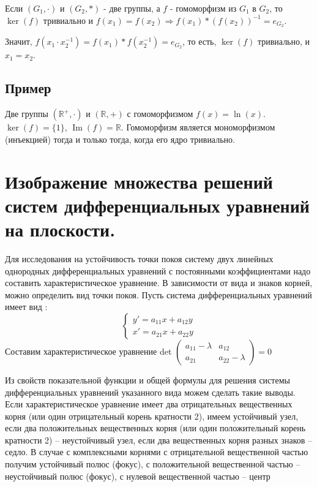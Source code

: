 \documentclass[12pt]{article}
\begin{document}
Если $(G_1,\cdot)$ и $(G_2,*)$ - две группы, а $f$ - гомоморфизм из $G_1$ в $G_2$, то $\operatorname{ker}(f)$ тривиально и $f(x_1)=f(x_2)\Rightarrow f(x_1)*(f(x_2))^{-1}=e_{G_2}$.

Значит, $f(x_1\cdot x_2^{-1})=f(x_1)*f(x_2^{-1})=e_{G_2}$, то есть, $\operatorname{ker}(f)$ тривиально, и $x_1=x_2$.

\subsection{Пример}

Две группы $(\mathbb{R}^{+},\cdot)$ и $(\mathbb{R},+)$ с гомоморфизмом $f(x) = \ln(x)$. $\ker(f) = \{1\}$, $\operatorname{Im}(f) = \mathbb{R}$. Гомоморфизм является мономорфизмом (инъекцией) тогда и только тогда, когда его ядро тривиально.

\setcounter{section}{30}
\section{ Изображение множества решений систем дифференциальных уравнений на плоскости.}

Для исследования на устойчивость точки покоя систему двух линейных однородных дифференциальных уравнений с постоянными коэффициентами надо составить характеристическое уравнение. В зависимости от вида и знаков корней, можно определить вид точки покоя.
Пусть система дифференциальных уравнений имеет вид :
\[
    \begin{cases}
        y'=a_{11}x+a_{12}y \\
        x'=a_{21}x+a_{22}y
    \end{cases}
\]
Составим характеристическое уравнение det
$\begin{pmatrix}
        a_{11}-\lambda & a_{12}         \\
        a_{21}         & a_{22}-\lambda
    \end{pmatrix} =0$


Из свойств показательной функции и общей формулы для решения системы дифференциальных
уравнений указанного вида можем сделать такие выводы.
Если характеристическое уравнение имеет два отрицательных вещественных корня (или один
отрицательный корень кратности 2), имеем устойчивый узел, если два положительных вещественных корня
(или один положительный корень кратности 2) – неустойчивый узел, если два вещественных корня разных
знаков – седло.
В случае с комплексными корнями с отрицательной вещественной частью получим устойчивый полюс
(фокус), с положительной вещественной частью – неустойчивый полюс (фокус), с нулевой вещественной
частью – центр
\end{document}

